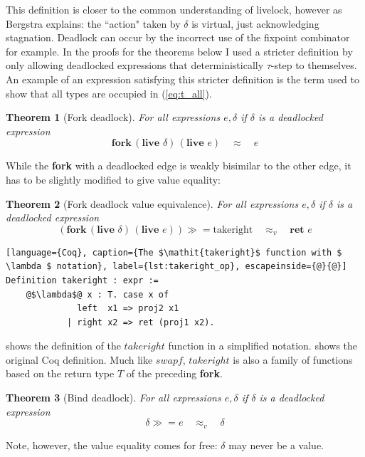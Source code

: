 \documentclass[12pt,twoside,notitlepage]{report}
\theoremstyle{plain}%
\newtheorem{thm}{Theorem}[section]
\theoremstyle{definition}
\theoremstyle{remark}
\begin{document}
This definition is closer to the common understanding of livelock, however as Bergstra\cite{bergstra1984process} explains: the ``action" taken by $ \delta $ is virtual, just acknowledging stagnation. Deadlock can occur by the incorrect use of the fixpoint combinator for example. In the proofs for the theorems below I used a stricter definition by only allowing deadlocked expressions that deterministically $ \tau $-step to themselves. An example of an expression satisfying this stricter definition is the term used to show that all types are occupied in (\ref{eq:t_all}).
\begin{thm}[Fork deadlock]
For all expressions $ e, \delta$ if $ \delta $ is a deadlocked expression
\[  \textbf{fork}\,(\textbf{live }\delta)\,(\textbf{live }e)\quad \approx \quad e \]
\end{thm}

While the \textbf{fork} with a deadlocked edge is weakly bisimilar to the other edge, it has to be slightly modified to give value equality:

\begin{thm}[Fork deadlock value equivalence]
For all expressions $ e, \delta$ if $ \delta $ is a deadlocked expression
\[  (\textbf{fork}\,(\textbf{live }\delta)\,(\textbf{live }e))\gg=\text{takeright}\quad \approx_v \quad \textbf{ret }e \]
\end{thm}

\begin{lstlisting}[language={Coq}, caption={The $\mathit{takeright}$ function with $ \lambda $ notation}, label={lst:takeright_op}, escapeinside={@}{@}]
Definition takeright : expr :=
    @$\lambda$@ x : T. case x of
              left  x1 => proj2 x1
            | right x2 => ret (proj1 x2).
\end{lstlisting}

 shows the definition of the $ \mathit{takeright} $ function in a simplified notation.  shows the original Coq definition. Much like $\mathit{swapf}$, $\mathit{takeright}$ is also a family of functions based on the return type $ T $ of the preceding \textbf{fork}.

\begin{thm}[Bind deadlock]
For all expressions $ e, \delta$ if $ \delta $ is a deadlocked expression
\[  \delta \gg= e\quad \approx_v \quad \delta \]
\end{thm}

Note, however, the value equality comes for free: $ \delta $ may never be a value.
\end{document}

